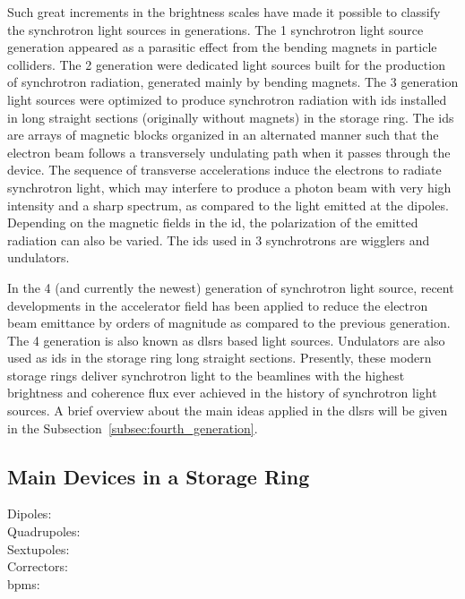 Such great increments in the brightness scales have made it possible to classify the synchrotron light sources in generations. The 1 synchrotron light source generation appeared as a parasitic effect from the bending magnets in particle colliders. The 2 generation were dedicated light sources built for the production of synchrotron radiation, generated mainly by bending magnets. The 3 generation light sources were optimized to produce synchrotron radiation with \glspl{id} installed in long straight sections (originally without magnets) in the storage ring. The \glspl{id} are arrays of magnetic blocks organized in an alternated manner such that the electron beam follows a transversely undulating path when it passes through the device. The sequence of transverse accelerations induce the electrons to radiate synchrotron light, which may interfere to produce a photon beam with very high intensity and a sharp spectrum, as compared to the light emitted at the dipoles. Depending on the magnetic fields in the \gls{id}, the polarization of the emitted radiation can also be varied. The \glspl{id} used in 3 synchrotrons are wigglers and undulators.

In the 4 (and currently the newest) generation of synchrotron light source, recent developments in the accelerator field has been applied to reduce the electron beam emittance by orders of magnitude as compared to the previous generation. The 4 generation is also known as \glspl{dlsr} based light sources. Undulators are also used as \glspl{id} in the storage ring long straight sections. Presently, these modern storage rings deliver synchrotron light to the beamlines with the highest brightness and coherence flux ever achieved in the history of synchrotron light sources. A brief overview about the main ideas applied in the \glspl{dlsr} will be given in the Subsection~\ref{subsec:fourth_generation}.
\subsection{Main Devices in a Storage Ring}


\begin{description}
    \item[Dipoles:]
    \item[Quadrupoles:]
    \item[Sextupoles:]
    \item[Correctors:]
    \item[\glspl{bpm}:]
\end{description}

